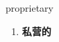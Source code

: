 
\begin{frame}
{\huge proprietary}
\begin{center}
\begin{enumerate}\Large
  \item \textbf{私营的}
\end{enumerate}
\end{center}
\end{frame}

